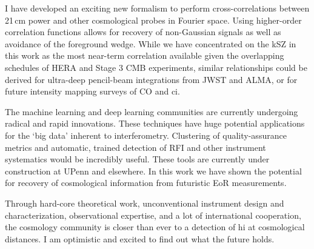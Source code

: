 I have developed an exciting new formalism to perform cross-correlations between 21\,cm power and other cosmological probes in Fourier space. Using higher-order correlation functions allows for recovery of non-Gaussian signals as well as avoidance of the foreground wedge. While we have concentrated on the kSZ in this work as the most near-term correlation available given the overlapping schedules of HERA and Stage 3 CMB experiments, similar relationships could be derived for ultra-deep pencil-beam integrations from JWST and ALMA, or for future intensity mapping surveys of CO and {\sc ci}.

The machine learning and deep learning communities are currently undergoing radical and rapid innovations. These techniques have huge potential applications for the `big data' inherent to interferometry. Clustering of quality-assurance metrics and automatic, trained detection of RFI and other instrument systematics would be incredibly useful. These tools are currently under construction at UPenn and elsewhere. In this work we have shown the potential for recovery of cosmological information from futuristic EoR measurements.

Through hard-core theoretical work, unconventional instrument design and characterization, observational expertise, and a lot of international cooperation, the cosmology community is closer than ever to a detection of {\sc hi} at cosmological distances. I am optimistic and excited to find out what the future holds.